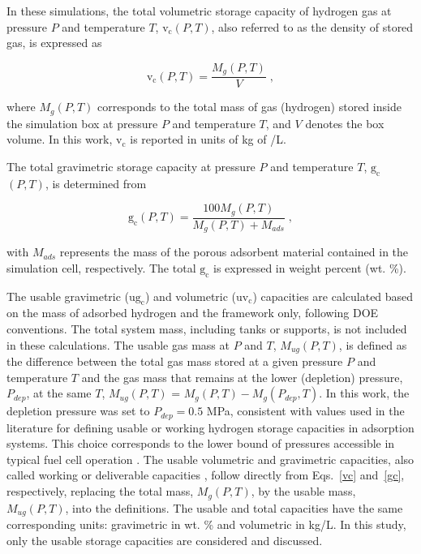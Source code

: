 \documentclass[review]{elsarticle}
\newcommand{\gc}{\mathrm{g_c}}
\newcommand{\vc}{\mathrm{v_c}}
\newcommand{\ugc}{\mathrm{ug_c}}
\newcommand{\uvc}{\mathrm{uv_c}}
\begin{document}
In these simulations, the total volumetric storage capacity of hydrogen gas at 
pressure $P$ and temperature $T$, $\vc(P,T)$, also referred to as the density 
of stored gas, is expressed as

\begin{equation}
\label{vc}
\vc(P,T) = \frac{M_g(P,T)}{V} \;,
\end{equation}

\noindent
where $M_g(P,T)$ corresponds to the total mass of gas (hydrogen) stored inside 
the simulation box at pressure $P$ and temperature $T$, and $V$ denotes the box 
volume. In this work, $\vc$ is reported in units of kg of /L.

The total gravimetric storage capacity at pressure $P$ and temperature $T$, 
$\gc$$(P,T)$, is determined from

\begin{equation}
\label{gc}
\gc(P,T) = \frac{100 M_g(P,T)}{M_g(P,T) + M_{ads}} \;,
\end{equation}

\noindent
with $M_{ads}$ represents the mass of the porous adsorbent material contained 
in the simulation cell, respectively. The total $\gc$ is expressed in weight 
percent (wt. \%).

The usable gravimetric ($\ugc$) and volumetric ($\uvc$) capacities are 
calculated based on the mass of adsorbed hydrogen and the framework only, 
following DOE conventions. The total system mass, including tanks or supports, 
is not included in these calculations.  The usable gas mass at $P$ and $T$, 
$M_{ug}(P,T)$, is defined as the difference between the total gas mass stored 
at a given pressure $P$ and temperature $T$ and the gas mass that remains at 
the lower (depletion) pressure, $P_{dep}$, at the same $T$, $M_{ug}(P,T)$ 
= $M_g(P,T) - M_g(P_{dep},T)$.  In this work, the depletion pressure was 
set to $P_{dep} = 0.5$ MPa, consistent with values used in the literature 
for defining usable or working hydrogen storage capacities in adsorption 
systems. This choice corresponds to the lower bound of pressures accessible 
in typical fuel cell operation \cite{cltgv21,rscf22}.  The usable volumetric 
and gravimetric capacities, also called working or deliverable capacities 
\cite{doe25,ahg+18,sh16}, follow directly from Eqs.~\ref{vc} and~\ref{gc}, 
respectively, replacing the total mass, $M_g(P,T)$, by the usable mass, 
$M_{ug}(P,T)$, into the definitions. The usable and total capacities have the 
same corresponding units: gravimetric in wt. \% and volumetric in kg/L. In 
this study, only the usable storage capacities are considered and discussed. 
\end{document}
